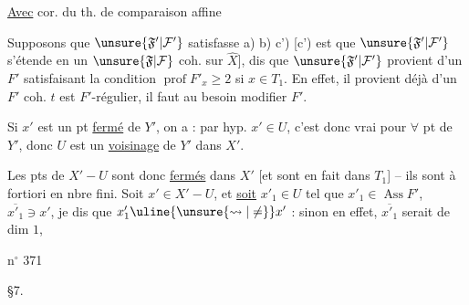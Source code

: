 

\uline{Avec} cor.  du th. de comparaison affine

Supposons que $\unsure{\mathfrak F'|\mathcal F'}$ satisfasse a) b) c')
[c') est que $\unsure{\mathfrak F'|\mathcal F'}$ s'étende en un
$\unsure{\mathfrak F|\mathcal F}$ coh. sur $\hat X$], 
dis que $\unsure{\mathfrak F'|\mathcal F'}$ provient d'un $F'$ satisfaisant la
condition $\operatorname{prof}F'_x\ge2$ si $x\in T_1$.
En effet,
il provient déjà d'un $F'$ coh. 
$t$ est $F'$-régulier, il faut au besoin modifier $F'$.




Si $x'$ est
un pt \uline{fermé} de  $Y'$, on a : par hyp.
$x'\in U$, c'est donc vrai pour $\forall$ pt de $Y'$,
donc $U$ est un \uline{voisinage} de $Y'$ dans $X'$.

Les pts de $X'-U$ sont donc \uline{fermés} dans $X'$
[et sont en fait dans $T_1$] -- ils sont à
fortiori en nbre fini. Soit $x'\in X'-U$, et
\uline{soit} 
$x'_1\in U$ tel que $x'_1\in\operatorname{Ass}F'$,
$\overline{x'_1}\ni x'$, je dis que 
$x'_1\uline{\unsure{\rightsquigarrow|\ne}}x'$ : sinon en effet, $\overline{x'_1}$ serait de dim $1$,


\hfill n$^\circ$ 371

\S7. 

